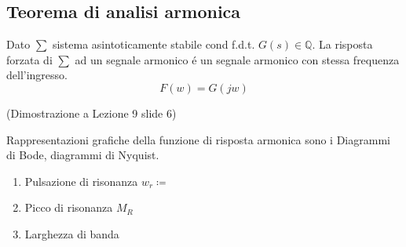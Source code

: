 \documentclass{article}
\begin{document}
\subsection{Teorema di analisi armonica}
Dato $\sum$ sistema asintoticamente stabile cond f.d.t. $G(s) \in \mathbb{Q}$. La risposta forzata di $\sum$ ad un segnale armonico \'e un segnale armonico con stessa frequenza dell'ingresso.
\[ F(w) = G(jw) \]

(Dimostrazione a Lezione 9 slide 6)

Rappresentazioni grafiche della funzione di risposta armonica sono i Diagrammi di Bode, diagrammi di Nyquist.

\begin{enumerate}
    \item Pulsazione di risonanza $w_r \coloneqq $
    \item Picco di risonanza $M_R$
    \item Larghezza di banda
\end{enumerate}
\end{document}

